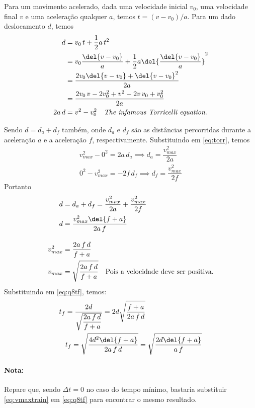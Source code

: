 \documentclass[]{IMTexam}
\begin{document}
\begin{questions}
\begin{solution}
		Para um movimento acelerado, dada uma velocidade inicial $ v_0 $, uma velocidade final $ v $ e uma aceleração qualquer $ a $, temos $ t=(v-v_0)/a $. Para um dado deslocamento $ d $, temos
		\begin{align}
			d     & =v_0\,t+\dfrac{1}{2}a\,t^{2}\nonumber                                               \\ &=v_0\dfrac{\del{v-v_0}}{a}+\dfrac{1}{2}a\del{\dfrac{\del{v-v_0}}{a}}^{2}\nonumber\\
			      & =\dfrac{2v_0\del{v-v_0}+\del{v-v_0}^{2}}{2a}\nonumber                               \\
			      & =\dfrac{2v_0\,v-2v_0^{2}+v^{2}-2v\,v_0+v_0^{2}}{2a}\nonumber                        \\
			2a\,d & =v^{2}-v_0^{2}\quad\text{\textit{The infamous Torricelli equation.}}\label{eq:torr}
		\end{align}

		Sendo $ d=d_a+d_f $ também, onde $ d_a $ e $ d_f $ são as distâncias percorridas durante a aceleração $ a $ e a aceleração $ f $, respectivamente. Substituindo em \ref{eq:torr}, temos
		\begin{gather*}
			v_{max}^{2}-0^{2}=2a\,d_a\implies d_a=\dfrac{v_{max}^{2}}{2a}\\
			0^{2}-v_{max}^{2}=-2f\,d_f \implies d_f=\dfrac{v_{max}^{2}}{2f}
		\end{gather*}
		Portanto
		\begin{align*}
			d           & =d_a+d_f=\dfrac{v_{max}^{2}}{2a}+\dfrac{v_{max}^{2}}{2f}                      \\
			d           & =\dfrac{v_{max}^{2}\del{f+a}}{2a\,f}                                          \\[1em]
			v_{max}^{2} & =\dfrac{2a\,f\,d}{f+a}                                                        \\
			v_{max}     & =\sqrt{\dfrac{2a\,f\,d}{f+a}}\quad\text{Pois a velocidade deve ser positiva.}
		\end{align*}
		Substituindo em \ref{eq:q8tf}, temos:
		\begin{align*}
			t_f & =\dfrac{2d}{\sqrt{\dfrac{2a\,f\,d}{f+a}}}=2d\sqrt{\dfrac{f+a}{2a\,f\,d}}      \\
			    & t_f=\sqrt{\dfrac{4d^{2}\del{f+a}}{2a\,f\,d}}=\sqrt{\dfrac{2d\del{f+a}}{a\,f}}
		\end{align*}
		\paragraph{Nota:} Repare que, sendo $ \Delta t=0 $ no caso do tempo mínimo, bastaria substituir \ref{eq:vmaxtrain} em \ref{eq:q8tf} para encontrar o mesmo resultado.


\end{solution}
\end{questions}
\end{document}
